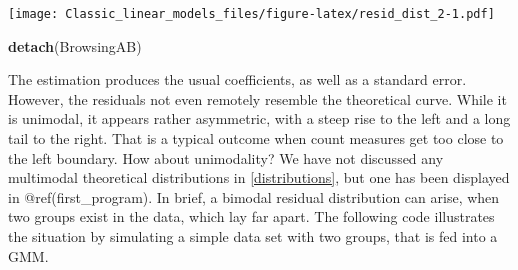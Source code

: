 \documentclass[]{svmono}
\newenvironment{Shaded}{\begin{snugshade}}{\end{snugshade}}
\newcommand{\KeywordTok}[1]{\textcolor[rgb]{0.13,0.29,0.53}{\textbf{#1}}}
\newcommand{\DataTypeTok}[1]{\textcolor[rgb]{0.13,0.29,0.53}{#1}}
\newcommand{\DecValTok}[1]{\textcolor[rgb]{0.00,0.00,0.81}{#1}}
\newcommand{\StringTok}[1]{\textcolor[rgb]{0.31,0.60,0.02}{#1}}
\newcommand{\OperatorTok}[1]{\textcolor[rgb]{0.81,0.36,0.00}{\textbf{#1}}}
\newcommand{\NormalTok}[1]{#1}
\theoremstyle{definition}
\theoremstyle{definition}
\theoremstyle{definition}
\theoremstyle{remark}
\begin{document}
\begin{Shaded}
\end{Shaded}

\texttt{[image: Classic\_linear\_models\_files/figure-latex/resid\_dist\_2-1.pdf]}

\begin{Shaded}
\begin{Highlighting}[]
\KeywordTok{detach}\NormalTok{(BrowsingAB)}
\end{Highlighting}
\end{Shaded}

The estimation produces the usual coefficients, as well as a standard
error. However, the residuals not even remotely resemble the theoretical
curve. While it is unimodal, it appears rather asymmetric, with a steep
rise to the left and a long tail to the right. That is a typical outcome
when count measures get too close to the left boundary. How about
unimodality? We have not discussed any multimodal theoretical
distributions in \ref{distributions}, but one has been displayed in
@ref(first\_program). In brief, a bimodal residual distribution can
arise, when two groups exist in the data, which lay far apart. The
following code illustrates the situation by simulating a simple data set
with two groups, that is fed into a GMM.
\end{document}
